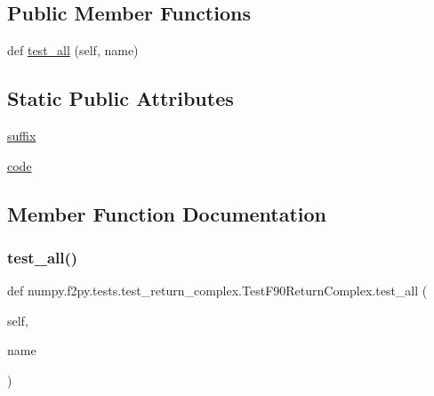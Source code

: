 \subsection*{Public Member Functions}
\begin{DoxyCompactItemize}
\item 
def \hyperlink{classnumpy_1_1f2py_1_1tests_1_1test__return__complex_1_1TestF90ReturnComplex_aef2a8d50ac49628aa46a00a1e1af68aa}{test\+\_\+all} (self, name)
\end{DoxyCompactItemize}
\subsection*{Static Public Attributes}
\begin{DoxyCompactItemize}
\item 
\hyperlink{classnumpy_1_1f2py_1_1tests_1_1test__return__complex_1_1TestF90ReturnComplex_ad4c9f0d22003d9b3fe0eec48e6131525}{suffix}
\item 
\hyperlink{classnumpy_1_1f2py_1_1tests_1_1test__return__complex_1_1TestF90ReturnComplex_a9d7fd0003f9374a167bfc9678e8b7832}{code}
\end{DoxyCompactItemize}


\subsection{Member Function Documentation}
\mbox{\label{classnumpy_1_1f2py_1_1tests_1_1test__return__complex_1_1TestF90ReturnComplex_aef2a8d50ac49628aa46a00a1e1af68aa}} 
\subsubsection{\texorpdfstring{test\+\_\+all()}{test\_all()}}
{\footnotesize\ttfamily def numpy.\+f2py.\+tests.\+test\+\_\+return\+\_\+complex.\+Test\+F90\+Return\+Complex.\+test\+\_\+all (\begin{DoxyParamCaption}\item[{}]{self,  }\item[{}]{name }\end{DoxyParamCaption})}



